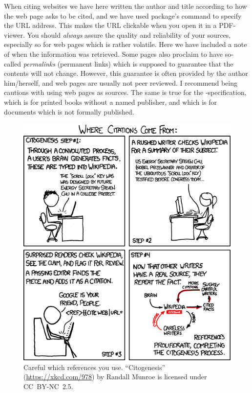 {When citing websites we have here written the author and title according to how the web page asks to be cited, and we have used  package's \latexin{\url} command to specify the URL address. This makes the URL clickable when you open it in a PDF-viewer. You should \emph{always} assure the quality and reliability of your sources, especially so for web pages which is rather volatile. Here we have included a note of when the information was retrieved. Some pages also proclaim to have so-called \emph{permalinks} (permanent links) which is supposed to guarantee that the contents will not change. However, this guarantee is often provided by the author him/herself, and web pages are usually not peer reviewed. I recommend being cautions with using web pages as sources. The same is true for the -specification, which is for printed books without a named publisher, and  which is for documents which is not formally published.

\begin{figure}
	\centering
	\includegraphics[scale=0.48]{graphics/citogenesis.png}
	\caption{Careful which references you use. ``Citogenesis'' (\url{https://xkcd.com/978}) by Randall Munroe is licensed under \mbox{CC~BY-NC~2.5}.}
	\label{fig:latex:citogenesis}
\end{figure}

}
